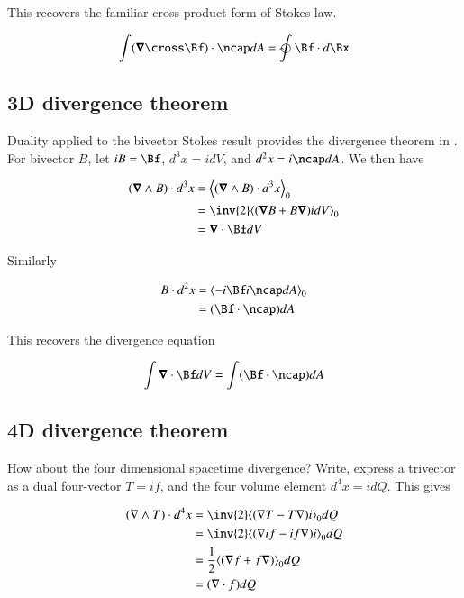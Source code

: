 This recovers the familiar cross product form of Stokes law.

\begin{align}
\int (\spacegrad \cross \Bf) \cdot \ncap dA = \ointclockwise \Bf \cdot d\Bx
\end{align}

\subsection{3D divergence theorem}

Duality applied to the bivector Stokes result provides the divergence theorem in .  For bivector $B$, let $iB = \Bf$, $d^3 x = i dV$, and $d^2 x = i \ncap dA$.  We then have

\begin{align*}
( \spacegrad \wedge B ) \cdot d^3 x
&=
\gpgradezero{ ( \spacegrad \wedge B ) \cdot d^3 x } \\
&=
\inv{2} \gpgradezero{ ( \spacegrad B + B \spacegrad ) i dV } \\
&=
\spacegrad \cdot \Bf dV \\
\end{align*}

Similarly

\begin{align*}
B \cdot d^2 x
&=
\gpgradezero{ 
-i\Bf i \ncap dA
} \\
&=
(\Bf \cdot \ncap) dA
 \\
\end{align*}

This recovers the  divergence equation

\begin{align}
\int \spacegrad \cdot \Bf dV = \int (\Bf \cdot \ncap) dA
\end{align}

\subsection{4D divergence theorem}

How about the four dimensional spacetime divergence?  Write, express a trivector as a dual four-vector $T = if$, and the four volume element $d^4 x = i dQ$.  This gives

\begin{align*}
(\grad \wedge T) \cdot d^4 x
&=
\inv{2} \gpgradezero{ (\grad T - T \grad) i } dQ \\
&=
\inv{2} \gpgradezero{ (\grad i f - if \grad) i } dQ \\
&=
\frac{1}{2} \gpgradezero{ (\grad f + f \grad) } dQ \\
&=
(\grad \cdot f) dQ
\end{align*}

